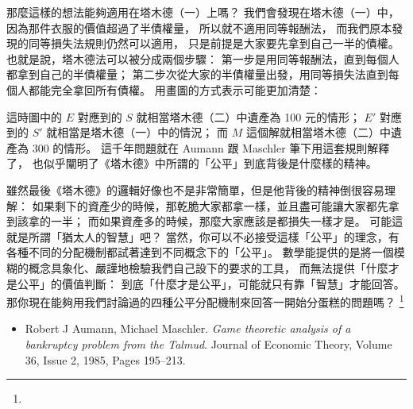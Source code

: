 \documentclass[10pt]{article}
\begin{document}
\begin{multicols*}{2}
那麼這樣的想法能夠適用在\textsf{塔木德（一）}上嗎？
我們會發現在\textsf{塔木德（一）}中，因為那件衣服的價值超過了半債權量，
所以就不適用\textsf{同等報酬法}，
而我們原本發現的\textsf{同等損失法}規則仍然可以適用，
只是前提是大家要先拿到自己一半的債權。
也就是說，\textsf{塔木德法}可以被分成兩個步驟：
第一步是用\textsf{同等報酬法}，直到每個人都拿到自己的半債權量；
第二步次從大家的半債權量出發，用\textsf{同等損失法}直到每個人都能完全拿回所有債權。
用畫圖的方式表示可能更加清楚：

這時圖中的 $E$ 對應到的 $S$ 就相當\textsf{塔木德（二）}中遺產為 100 元的情形；
$E'$ 對應到的 $S'$ 就相當是\textsf{塔木德（一）}中的情況；
而 $M$ 這個解就相當\textsf{塔木德（二）}中遺產為 300 的情形。
這千年問題就在 Aumann 跟 Maschler 筆下用這套規則解釋了，
也似乎闡明了《塔木德》中所謂的「公平」到底背後是什麼樣的精神。

\separationline

雖然最後《塔木德》的邏輯好像也不是非常簡單，但是他背後的精神倒很容易理解：
如果剩下的資產少的時候，那乾脆大家都拿一樣，並且盡可能讓大家都先拿到該拿的一半；
而如果資產多的時候，那麼大家應該是都損失一樣才是。
可能這就是所謂「猶太人的智慧」吧？
當然，你可以不必接受這樣「公平」的理念，有各種不同的分配機制都試著達到不同概念下的「公平」。
數學能提供的是將一個模糊的概念具象化、嚴謹地檢驗我們自己設下的要求的工具，
而無法提供「什麼才是公平」的價值判斷：
到底「什麼才是公平」，可能就只有靠「智慧」才能回答。
那你現在能夠用我們討論過的四種公平分配機制來回答一開始分蛋糕的問題嗎？
\footnote{}
\asDemonstrated

\vfill{}
\begin{itemize}
	\item[{[1]}]
		Robert J Aumann, Michael Maschler.
		\textit{Game theoretic analysis of a bankruptcy problem from the Talmud}.
		Journal of Economic Theory, Volume 36, Issue 2, 1985, Pages 195--213.
\end{itemize}
\hfill{}

\end{multicols*}
\end{document}
